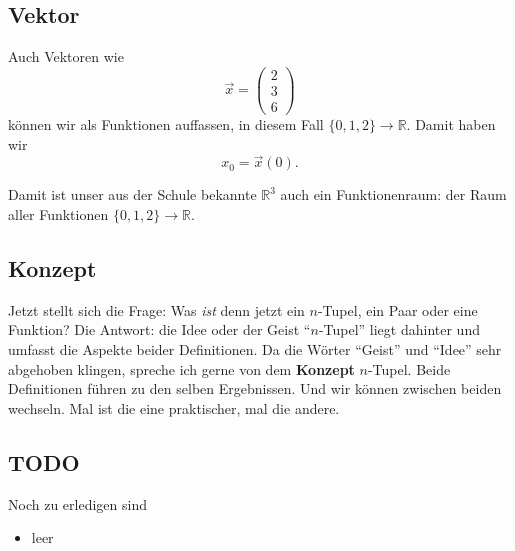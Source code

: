 \documentclass[a4paper]{amsart}
\theoremstyle{definition}
\newcommand{\R}{\ensuremath{\mathbb{ R }}}
\begin{document}
\subsection{Vektor}
Auch Vektoren wie
\begin{equation}
    \vec x = \begin{pmatrix}
        2\\3\\6
    \end{pmatrix}
\end{equation}
können wir als Funktionen auffassen, in diesem Fall $\{0,1,2\} \to \R$. Damit haben wir
\begin{equation}
    x_0 = \vec x (0).
\end{equation}

Damit ist unser aus der Schule bekannte $\R^3$ auch ein Funktionenraum: der Raum aller Funktionen $\{0,1,2\} \to \R$.

\subsection{Konzept}
Jetzt stellt sich die Frage: Was \emph{ist} denn jetzt ein $n$-Tupel, ein Paar oder eine Funktion? Die Antwort: die Idee oder der Geist "`$n$-Tupel"' liegt dahinter und umfasst die Aspekte beider Definitionen. Da die Wörter "`Geist"' und "`Idee"' sehr abgehoben klingen, spreche ich gerne von dem \textbf{Konzept} $n$-Tupel. Beide Definitionen führen zu den selben Ergebnissen. Und wir können zwischen beiden wechseln. Mal ist die eine praktischer, mal die andere.

\begin{backup}
\section{TODO}
Noch zu erledigen sind
\begin{itemize}
   \item leer
\end{itemize}
\end{backup}
\end{document}
